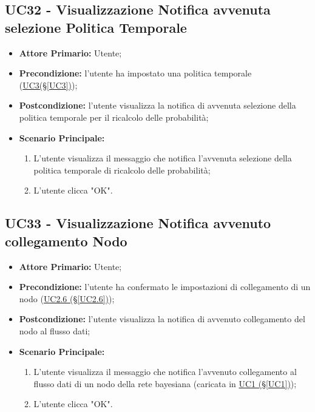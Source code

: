 \subsection{UC32 - Visualizzazione Notifica avvenuta selezione Politica Temporale}\label{UC32}

\begin{itemize}
	\item \textbf{Attore Primario:} Utente;
	\item \textbf{Precondizione:} l'utente ha impostato una politica temporale (\hyperref[UC3]{UC3(§\ref*{UC3})});
	\item \textbf{Postcondizione:} l'utente visualizza la notifica di avvenuta selezione della politica temporale per il ricalcolo delle probabilità;
	\item \textbf{Scenario Principale:}
	\begin{enumerate}
		\item L'utente visualizza il messaggio che notifica l'avvenuta selezione della politica temporale di ricalcolo delle probabilità;
		\item L'utente clicca "OK".
	\end{enumerate}
\end{itemize}

\pagebreak

\subsection{UC33 - Visualizzazione Notifica avvenuto collegamento Nodo}\label{UC33}

\begin{itemize}
	\item \textbf{Attore Primario:} Utente;
	\item \textbf{Precondizione:} l'utente ha confermato le impostazioni di collegamento di un nodo (\hyperref[UC2.6]{UC2.6 (§\ref*{UC2.6})});
	\item \textbf{Postcondizione:} l'utente visualizza la notifica di avvenuto collegamento del nodo al flusso dati;
	\item \textbf{Scenario Principale:}
	\begin{enumerate}
		\item L'utente visualizza il messaggio che notifica l'avvenuto collegamento al flusso dati di un nodo della rete bayesiana (caricata in \hyperref[UC1]{UC1 (§\ref*{UC1})});
		\item L'utente clicca "OK".
	\end{enumerate}
\end{itemize}

